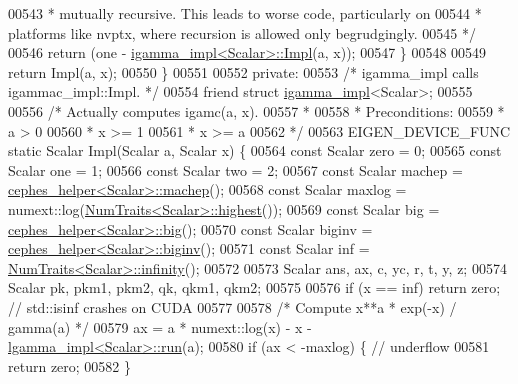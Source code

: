 \begin{DoxyCode}
00543 \textcolor{comment}{       * mutually recursive.  This leads to worse code, particularly on}
00544 \textcolor{comment}{       * platforms like nvptx, where recursion is allowed only begrudgingly.}
00545 \textcolor{comment}{       */}
00546       \textcolor{keywordflow}{return} (one - \hyperlink{struct_eigen_1_1internal_1_1igamma__impl}{igamma\_impl<Scalar>::Impl}(a, x));
00547     \}
00548 
00549     \textcolor{keywordflow}{return} Impl(a, x);
00550   \}
00551 
00552  \textcolor{keyword}{private}:
00553   \textcolor{comment}{/* igamma\_impl calls igammac\_impl::Impl. */}
00554   \textcolor{keyword}{friend} \textcolor{keyword}{struct }\hyperlink{struct_eigen_1_1internal_1_1igamma__impl}{igamma\_impl}<Scalar>;
00555 
00556   \textcolor{comment}{/* Actually computes igamc(a, x).}
00557 \textcolor{comment}{   *}
00558 \textcolor{comment}{   * Preconditions:}
00559 \textcolor{comment}{   *   a > 0}
00560 \textcolor{comment}{   *   x >= 1}
00561 \textcolor{comment}{   *   x >= a}
00562 \textcolor{comment}{   */}
00563   EIGEN\_DEVICE\_FUNC \textcolor{keyword}{static} Scalar Impl(Scalar a, Scalar x) \{
00564     \textcolor{keyword}{const} Scalar zero = 0;
00565     \textcolor{keyword}{const} Scalar one = 1;
00566     \textcolor{keyword}{const} Scalar two = 2;
00567     \textcolor{keyword}{const} Scalar machep = \hyperlink{struct_eigen_1_1internal_1_1cephes__helper}{cephes\_helper<Scalar>::machep}();
00568     \textcolor{keyword}{const} Scalar maxlog = numext::log(\hyperlink{group___core___module_struct_eigen_1_1_num_traits}{NumTraits<Scalar>::highest}());
00569     \textcolor{keyword}{const} Scalar big = \hyperlink{struct_eigen_1_1internal_1_1cephes__helper}{cephes\_helper<Scalar>::big}();
00570     \textcolor{keyword}{const} Scalar biginv = \hyperlink{struct_eigen_1_1internal_1_1cephes__helper}{cephes\_helper<Scalar>::biginv}();
00571     \textcolor{keyword}{const} Scalar inf = \hyperlink{group___core___module_struct_eigen_1_1_num_traits}{NumTraits<Scalar>::infinity}();
00572 
00573     Scalar ans, ax, c, yc, r, t, y, z;
00574     Scalar pk, pkm1, pkm2, qk, qkm1, qkm2;
00575 
00576     \textcolor{keywordflow}{if} (x == inf) \textcolor{keywordflow}{return} zero;  \textcolor{comment}{// std::isinf crashes on CUDA}
00577 
00578     \textcolor{comment}{/* Compute  x**a * exp(-x) / gamma(a)  */}
00579     ax = a * numext::log(x) - x - \hyperlink{struct_eigen_1_1internal_1_1lgamma__impl}{lgamma\_impl<Scalar>::run}(a);
00580     \textcolor{keywordflow}{if} (ax < -maxlog) \{  \textcolor{comment}{// underflow}
00581       \textcolor{keywordflow}{return} zero;
00582     \}

\end{DoxyCode}
